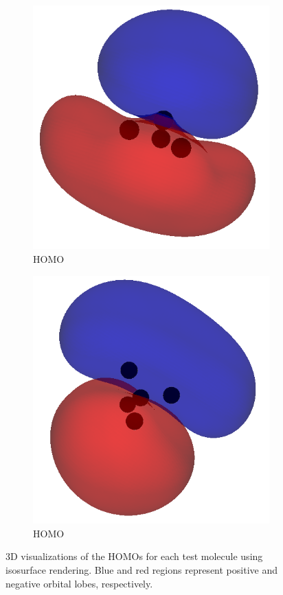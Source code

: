 \documentclass[12pt]{article}
\begin{document}
\begin{figure}[H]
    \begin{subfigure}[b]{0.25\textwidth}
        \includegraphics[width=\textwidth]{figures/nh3_homo.png}
        \caption{ HOMO}
    \end{subfigure}
    \hspace{1em}
    \begin{subfigure}[b]{0.25\textwidth}
        \includegraphics[width=\textwidth]{figures/ch4_homo.png}
        \caption{ HOMO}
    \end{subfigure}

    \caption{3D visualizations of the HOMOs for each test molecule using isosurface rendering. Blue and red regions represent positive and negative orbital lobes, respectively.}
\end{figure}
\end{document}
